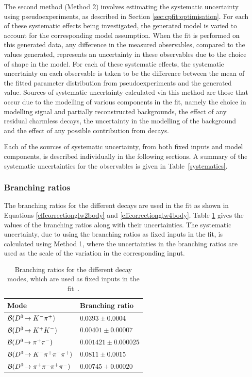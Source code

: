 The second method (Method 2) involves estimating the systematic uncertainty using pseudoexperiments, as described in Section \ref{sec:cpfit:optimisation}. For each of these systematic effects being investigated, the generated model is varied to account for the corresponding model assumption. When the \CP fit is performed on this generated data, any difference in the measured \CP observables, compared to the values generated, represents an uncertainty in these observables due to the choice of shape in the model. For each of these systematic effects, the systematic uncertainty on each observable is taken to be the difference between the mean of the fitted parameter distribution from pseudoexperiments and the generated value. Sources of systematic uncertainty calculated via this method are those that occur due to the modelling of various components in the \CP fit, namely the choice in modelling signal and partially reconstructed backgrounds, the effect of any residual charmless \B decays, the uncertainty in the modelling of the  background and the effect of any possible contribution from  decays.

Each of the sources of systematic uncertainty, from both fixed inputs and model components, is described individually in the following sections. A summary of the systematic uncertainties for the \CP observables is given in Table~\ref{systematics}.

\subsubsection{Branching ratios}

The branching ratios for the different \Dz decays are used in the \CP fit as shown in Equations \ref{effcorrectionglw2body} and \ref{effcorrectionglw4body}. Table \ref{BR} gives the values of the branching ratios along with their uncertainties. The systematic uncertainty, due to using the branching ratios as fixed inputs in the \CP fit, is calculated using Method 1, where the uncertainties in the branching ratios are used as the scale of the variation in the corresponding input.

\begin{table}
\centering
\begin{tabular}{l|l}
\hline
Mode & Branching ratio \\
\hline
$\mathcal{B}({{D}^0}\!\rightarrow {\ensuremath{{K}^-}}{\ensuremath{{\pi}^+}})$ & $0.0393 \pm 0.0004$ \\
$\mathcal{B}({{D}^0}\!\rightarrow {\ensuremath{{K}^+}}{\ensuremath{{K}^-}})$ & $0.00401 \pm 0.00007$ \\
$\mathcal{B}({{D}^0}\!\rightarrow {\ensuremath{{\pi}^+}}{\ensuremath{{\pi}^-}})$ & $0.001421 \pm 0.000025$ \\
$\mathcal{B}({{D}^0}\!\rightarrow {\ensuremath{{K}^-}}{\ensuremath{{\pi}^+}}{\ensuremath{{\pi}^-}}{\ensuremath{{\pi}^+}})$ & $0.0811 \pm 0.0015$ \\
$\mathcal{B}({{D}^0}\!\rightarrow {\ensuremath{{\pi}^+}}{\ensuremath{{\pi}^-}}{\ensuremath{{\pi}^+}}{\ensuremath{{\pi}^-}})$ & $0.00745 \pm 0.00020$ \\
\hline
\end{tabular}
\caption{Branching ratios for the different \Dz decay modes, which are used as fixed inputs in the \CP fit~\cite{PDG2014}.}
\label{BR}
\end{table}

